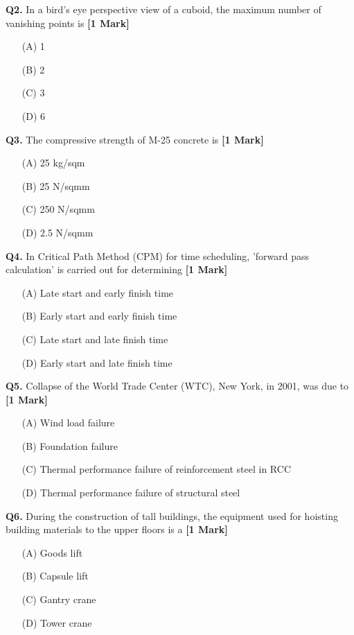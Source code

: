 \documentclass[11pt]{article}
\newcommand{\questiona}[2]{
    \noindent\textbf{Q#2.} #1 \hfill \textbf{[1 Mark]}
}
\begin{document}
\questiona{In a bird's eye perspective view of a cuboid, the maximum number of vanishing points is}{2}
\begin{enumerate}
    \item[(A)] 1  
    \item[(B)] 2  
    \item[(C)] 3  
    \item[(D)] 6  
\end{enumerate}
\vspace{0.5cm}

\questiona{The compressive strength of M-25 concrete is}{3}
\begin{enumerate}
    \item[(A)] 25 kg/sqm  
    \item[(B)] 25 N/sqmm  
    \item[(C)] 250 N/sqmm  
    \item[(D)] 2.5 N/sqmm  
\end{enumerate}
\vspace{0.5cm}

\questiona{In Critical Path Method (CPM) for time scheduling, 'forward pass calculation' is carried out for determining}{4}
\begin{enumerate}
    \item[(A)] Late start and early finish time  
    \item[(B)] Early start and early finish time  
    \item[(C)] Late start and late finish time  
    \item[(D)] Early start and late finish time  
\end{enumerate}
\vspace{0.5cm}

\questiona{Collapse of the World Trade Center (WTC), New York, in 2001, was due to}{5}
\begin{enumerate}
    \item[(A)] Wind load failure  
    \item[(B)] Foundation failure  
    \item[(C)] Thermal performance failure of reinforcement steel in RCC  
    \item[(D)] Thermal performance failure of structural steel  
\end{enumerate}
\vspace{0.5cm}

\questiona{During the construction of tall buildings, the equipment used for hoisting building materials to the upper floors is a}{6}
\begin{enumerate}
    \item[(A)] Goods lift  
    \item[(B)] Capsule lift  
    \item[(C)] Gantry crane  
    \item[(D)] Tower crane  
\end{enumerate}
\vspace{0.5cm}
\end{document}
